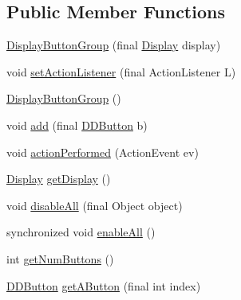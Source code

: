 \subsection*{Public Member Functions}
\begin{DoxyCompactItemize}
\item 
\hyperlink{classgov_1_1fnal_1_1ppd_1_1dd_1_1util_1_1specific_1_1DisplayButtonGroup_a6f9718d1b768e1fa3eda6a3a4eb69d40}{Display\-Button\-Group} (final \hyperlink{interfacegov_1_1fnal_1_1ppd_1_1dd_1_1signage_1_1Display}{Display} display)
\item 
void \hyperlink{classgov_1_1fnal_1_1ppd_1_1dd_1_1util_1_1specific_1_1DisplayButtonGroup_a545327f6d7ef9578d104b127a6c82d24}{set\-Action\-Listener} (final Action\-Listener L)
\item 
\hyperlink{classgov_1_1fnal_1_1ppd_1_1dd_1_1util_1_1specific_1_1DisplayButtonGroup_aa923be0edd34fa1f305617331dc319b0}{Display\-Button\-Group} ()
\item 
void \hyperlink{classgov_1_1fnal_1_1ppd_1_1dd_1_1util_1_1specific_1_1DisplayButtonGroup_a17247fef1235129760371a73db7ac4d0}{add} (final \hyperlink{classgov_1_1fnal_1_1ppd_1_1dd_1_1changer_1_1DDButton}{D\-D\-Button} b)
\item 
void \hyperlink{classgov_1_1fnal_1_1ppd_1_1dd_1_1util_1_1specific_1_1DisplayButtonGroup_a32cc420f7da391926d3409690f5ddf55}{action\-Performed} (Action\-Event ev)
\item 
\hyperlink{interfacegov_1_1fnal_1_1ppd_1_1dd_1_1signage_1_1Display}{Display} \hyperlink{classgov_1_1fnal_1_1ppd_1_1dd_1_1util_1_1specific_1_1DisplayButtonGroup_a65b7c3ebe0e08f2251a61bc8aa4ba573}{get\-Display} ()
\item 
void \hyperlink{classgov_1_1fnal_1_1ppd_1_1dd_1_1util_1_1specific_1_1DisplayButtonGroup_a6b4d63b4caabfe2bb8bc321466e5d1a4}{disable\-All} (final Object object)
\item 
synchronized void \hyperlink{classgov_1_1fnal_1_1ppd_1_1dd_1_1util_1_1specific_1_1DisplayButtonGroup_a62ff8f4f3c41684101239ee45ad1a397}{enable\-All} ()
\item 
int \hyperlink{classgov_1_1fnal_1_1ppd_1_1dd_1_1util_1_1specific_1_1DisplayButtonGroup_ad4eaf31c8517f16fd68991cedcf0e0ca}{get\-Num\-Buttons} ()
\item 
\hyperlink{classgov_1_1fnal_1_1ppd_1_1dd_1_1changer_1_1DDButton}{D\-D\-Button} \hyperlink{classgov_1_1fnal_1_1ppd_1_1dd_1_1util_1_1specific_1_1DisplayButtonGroup_a81d575f445c7ae52a78facdf423ca8b2}{get\-A\-Button} (final int index)
\end{DoxyCompactItemize}


